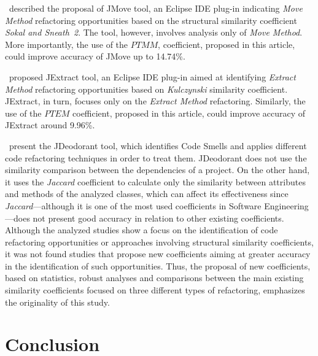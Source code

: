 \documentclass[smallextended,natbib]{svjour3}
\begin{document}
{ \citet{terra2018jmove}~described the proposal of JMove tool, an Eclipse IDE plug-in indicating \textit{Move Method} refactoring opportunities based on the structural similarity coefficient \textit{Sokal and Sneath~2}. The tool, however, involves analysis only of \textit{Move Method}. More importantly, the use of the $PTMM$, coefficient, proposed in this article, could improve accuracy of JMove up to 14.74\%.

\citet{2014_icpc}~proposed JExtract tool, an Eclipse IDE plug-in aimed at identifying \textit{Extract Method} refactoring opportunities based on \textit{Kulczynski} similarity coefficient. JExtract, in turn, focuses only on the \textit{Extract Method} refactoring. Similarly, the use of the $PTEM$ coefficient, proposed in this article, could improve accuracy of JExtract around 9.96\%.


\citet{jdeodoranttse, jdeodoratcsmr}~present the JDeodorant tool, which identifies Code Smells and applies different code refactoring techniques in order to treat them. JDeodorant does not use the similarity comparison between the dependencies of a project. On the other hand, it uses the \textit{Jaccard} coefficient to calculate only the similarity between attributes and methods of the analyzed classes, which can affect its effectiveness since \textit{Jaccard}---although it is one of the most used coefficients in Software Engineering---does not present good accuracy in relation to other existing coefficients.\\[-0.2cm]

Although the analyzed studies show a focus on the identification of code refactoring opportunities or approaches involving structural similarity coefficients, it was not found studies that propose new coefficients aiming at greater accuracy in the identification of such opportunities. Thus, the proposal of new coefficients, based on statistics, robust analyses and comparisons between the main existing similarity coefficients focused on three different types of refactoring, emphasizes the originality of this study.

\section{Conclusion}
\label{sec:conclusao}

}
\end{document}
